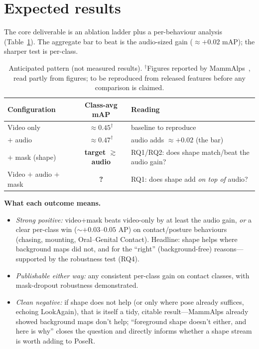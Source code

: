 \documentclass[11pt]{article}
\begin{document}
\section{Expected results}
The core deliverable is an ablation ladder plus a per-behaviour analysis (Table~\ref{tab:expected}). The aggregate bar to beat is the audio-sized gain ($\approx +0.02$ mAP); the sharper test is per-class.

\begin{table}[h]
\centering
\begin{tabular}{@{}lcl@{}}
\toprule
Configuration & Class-avg mAP & Reading \\
\midrule
Video only            & $\approx 0.45^{\dagger}$ & baseline to reproduce \\
\quad $+$ audio        & $\approx 0.47^{\dagger}$ & audio adds $\approx +0.02$ (the bar) \\
\quad $+$ mask (shape) & \textbf{target $\gtrsim$ audio} & RQ1/RQ2: does shape match/beat the audio gain? \\
Video $+$ audio $+$ mask & \textbf{?} & RQ1: does shape add \emph{on top of} audio? \\
\bottomrule
\end{tabular}
\caption{Anticipated pattern (not measured results). $^{\dagger}$Figures reported by MammAlps~\cite{mammalps}, read partly from figures; to be reproduced from released features before any comparison is claimed.}
\label{tab:expected}
\end{table}

\noindent\textbf{What each outcome means.}
\begin{itemize}
  \item \emph{Strong positive:} video+mask beats video-only by at least the audio gain, \emph{or} a clear per-class win ($\sim+0.03$--$0.05$ AP) on contact/posture behaviours (chasing, mounting, Oral--Genital Contact). Headline: shape helps where background maps did not, and for the ``right'' (background-free) reasons---supported by the robustness test (RQ4).
  \item \emph{Publishable either way:} any consistent per-class gain on contact classes, with mask-dropout robustness demonstrated.
  \item \emph{Clean negative:} if shape does not help (or only where pose already suffices, echoing LookAgain), that is itself a tidy, citable result---MammAlps already showed background maps don't help; ``foreground shape doesn't either, and here is why'' closes the question and directly informs whether a shape stream is worth adding to PoseR.
\end{itemize}
\end{document}

